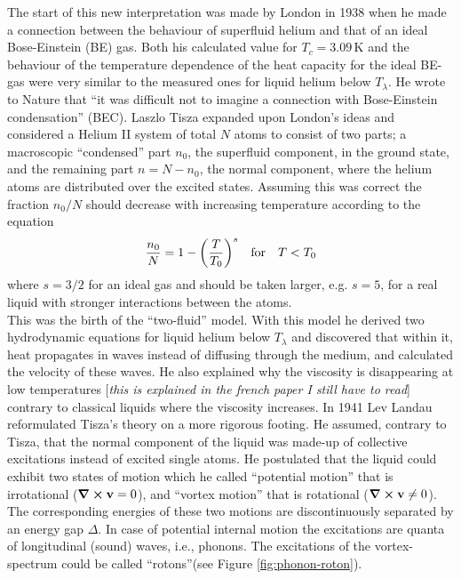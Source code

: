 \documentclass[12pt,a4paper,twosides]{book}
\renewcommand{\vec}[1]{\bm{\mathrm{#1}}}
\newcommand{\unit}[1]{\,\mathrm{#1}}
\begin{document}
		The start of this new interpretation was made by London in 1938 when he made a connection between the behaviour of superfluid helium and that of an ideal Bose-Einstein (BE) gas. Both his calculated value for $T_c=3.09\unit{K}$ and the behaviour of the temperature dependence of the heat capacity for the ideal BE-gas were very similar to the measured ones for liquid helium below $T_\lambda$. He wrote to Nature that ``it was difficult not to imagine a connection with Bose-Einstein condensation'' (BEC). Laszlo Tisza expanded upon London's ideas and considered a Helium II system of total $N$ atoms to consist of two parts; a macroscopic ``condensed'' part $n_0$, the superfluid component, in the ground state, and the remaining part $n=N-n_0$, the normal component, where the helium atoms are distributed over the excited states. Assuming this was correct the fraction $n_0/N$ should decrease with increasing temperature according to the equation\\
		\begin{align}
			\frac{n_0}{N} = 1-\qty(\frac{T}{T_0})^s \quad \text{for} \quad T<T_0
		\end{align}
		where $s=3/2$ for an ideal gas and should be taken larger, e.g. $s=5$, for a real liquid with stronger interactions between the atoms.\\
		
		This was the birth of the ``two-fluid'' model. With this model he derived two hydrodynamic equations for liquid helium below $T_\lambda$ and discovered that within it, heat propagates in waves instead of diffusing through the medium, and calculated the velocity of these waves. He also explained why the viscosity is disappearing at low temperatures [\emph{this is explained in the french paper I still have to read}] contrary to classical liquids where the viscosity increases. In 1941 Lev Landau reformulated Tisza's theory on a more rigorous footing. He assumed, contrary to Tisza, that the normal component of the liquid was made-up of collective excitations instead of excited single atoms. He postulated that the liquid could exhibit two states of motion which he called ``potential motion'' that is irrotational ($\curl{\vec{v}}=0$), and ``vortex motion'' that is rotational ($\curl{\vec{v}} \neq 0$). The corresponding energies of these two motions are discontinuously separated by an energy gap $\Delta$. In case of potential internal motion  the excitations are quanta of longitudinal (sound) waves, i.e., phonons. The excitations of the vortex-spectrum could be called ``rotons''(see Figure \ref{fig:phonon-roton}).\\
\end{document}

